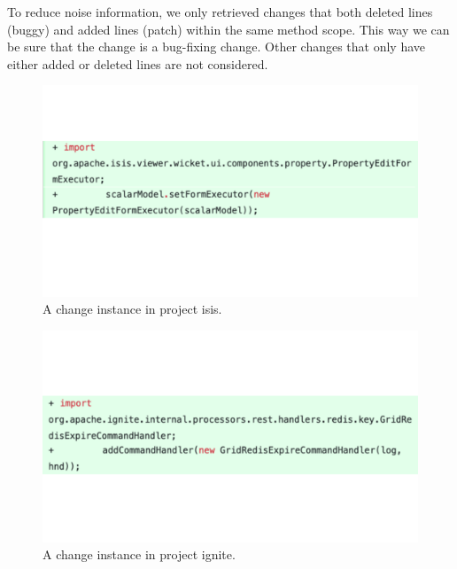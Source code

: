 To reduce noise information, we only retrieved changes that both deleted lines (buggy) and added lines (patch) within the same method scope.
This way we can be sure that the change is a bug-fixing change. 
Other changes that only have either added or deleted lines are not considered.


\begin{figure}[!ht]
    \renewcommand{\arraystretch}{1}
    \centering
    \includegraphics[width=\linewidth]{figures/cbcv-1.pdf}\hfill
    \caption{A change instance in project isis.}
    \label{fig:cbcv_1}
\end{figure}
    
\begin{figure}[!ht]
    \renewcommand{\arraystretch}{1}
    \centering
    \includegraphics[width=\linewidth]{figures/cbcv-2.pdf}\hfill
    \caption{A change instance in project ignite.}
    \label{fig:cbcv_2}
\end{figure}

